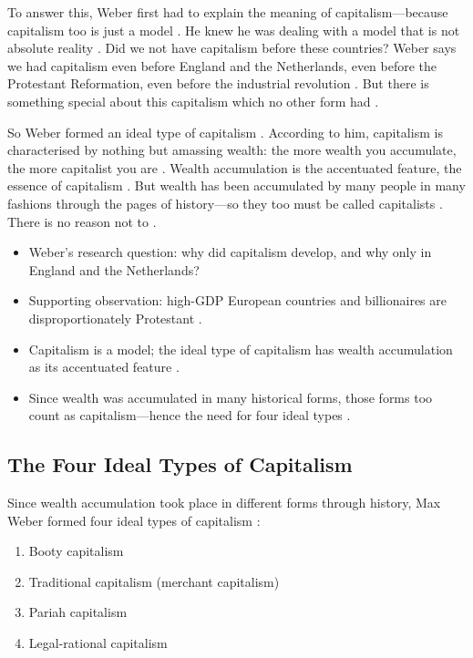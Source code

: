 To answer this, Weber first had to explain the meaning of capitalism---because capitalism too is just a model . He knew he was dealing with a model that is not absolute reality .
Did we not have capitalism before these countries? Weber says we had capitalism even before England and the Netherlands, even before the Protestant Reformation, even before the industrial revolution . But there is something special about this capitalism which no other form had .

So Weber formed an ideal type of capitalism . According to him, capitalism is characterised by nothing but amassing wealth: the more wealth you accumulate, the more capitalist you are . Wealth accumulation is the accentuated feature, the essence of capitalism .
But wealth has been accumulated by many people in many fashions through the pages of history---so they too must be called capitalists . There is no reason not to .

\begin{QuickRevision}
\begin{itemize}
    \item Weber's research question: why did capitalism develop, and why only in England and the Netherlands? 
    \item Supporting observation: high-GDP European countries and billionaires are disproportionately Protestant .
    \item Capitalism is a model; the ideal type of capitalism has wealth accumulation as its accentuated feature .
    \item Since wealth was accumulated in many historical forms, those forms too count as capitalism---hence the need for four ideal types .
\end{itemize}
\end{QuickRevision}

\subsection{The Four Ideal Types of Capitalism}
Since wealth accumulation took place in different forms through history, Max Weber formed four ideal types of capitalism :
\begin{enumerate}
    \item Booty capitalism 
    \item Traditional capitalism (merchant capitalism) 
    \item Pariah capitalism 
    \item Legal-rational capitalism 
\end{enumerate}


